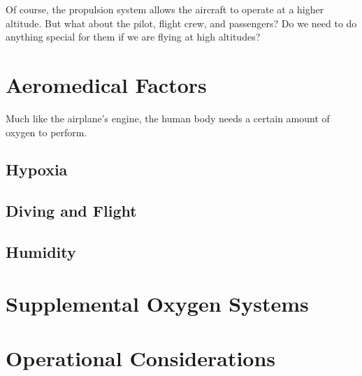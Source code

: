 Of course, the propulsion system allows the aircraft to operate at a higher altitude. But what about the pilot, flight crew, and passengers? Do we need to do anything special for them if we are flying at high altitudes?

\section{Aeromedical Factors}

Much like the airplane's engine, the human body needs a certain amount of oxygen to perform.

\subsection{Hypoxia}

\subsection{Diving and Flight}

\subsection{Humidity}

\section{Supplemental Oxygen Systems}

\section{Operational Considerations}

